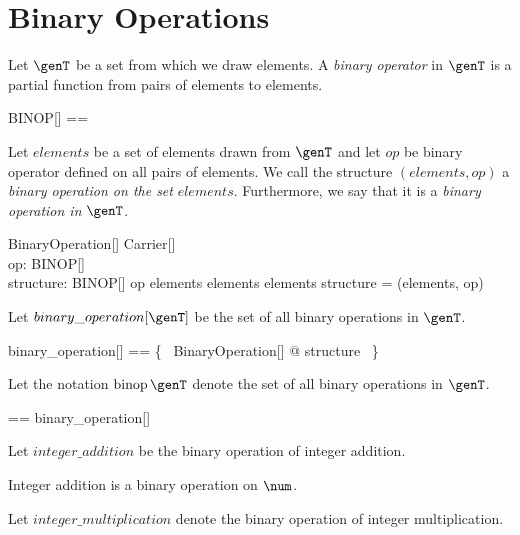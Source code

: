 \documentclass{amsart}
\begin{document}
\section{Binary Operations}

Let $\genT$ be a set from which we draw elements.
A \textit{binary operator} in $\genT$ is a partial function from pairs of elements to elements.
\begin{zed}
	BINOP[\genT] == \genT \cross \genT \pfun \genT
\end{zed}

Let $elements$ be a set of elements drawn from $\genT$ and
let $op$ be binary operator defined on all pairs of elements.
We call the structure $(elements, op)$ a \textit{binary operation on the set} $elements$.
Furthermore, we say that it is a \textit{binary operation in} $\genT$.

\begin{schema}{BinaryOperation}[\genT]
	Carrier[\genT] \\
	op: BINOP[\genT] \\
	structure: \power \genT \cross BINOP[\genT]
\where
	op \in elements \cross elements \fun elements
\also
	structure = (elements, op)
\end{schema}

Let $binary\_operation[\genT]$ be the set of all binary operations in $\genT$.
\begin{zed}
	binary\_operation[\genT] == \{~ BinaryOperation[\genT] @ structure ~\}
\end{zed}

Let the notation $\binop \genT$ denote the set of all binary operations in $\genT$.
\begin{zed}
	\binop \genT == binary\_operation[\genT]
\end{zed}

Let $integer\_addition$ be the binary operation of integer addition.

\begin{example}
Integer addition is a binary operation on $\num$.
\end{example}

Let $integer\_multiplication$ denote the binary operation of integer multiplication.
\end{document}
